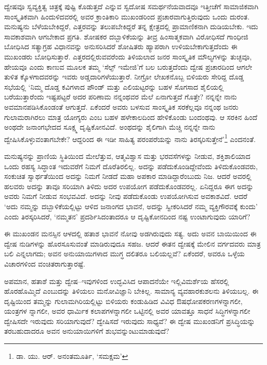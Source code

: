 ದ್ವೇಷವೂ ಸ್ವವ್ಯಕ್ತಿತ್ವ ಚಿತ್ರಕ್ಕೆ ಪುಷ್ಟಿ ಕೊಡುತ್ತದೆ ಎನ್ನುವ ಸ್ವದೋಷ ಸಮರ್ಥನೆಯವಾದವೂ ಇತ್ತೀಚೆಗೆ ಸಾಮಾಜಿಕವಾಗಿ ಸಾಂಸ್ಕೃತಿಕವಾಗಿ ಹಿಂದುಳಿದವರಲ್ಲಿ ಅವರ ಕ್ರಾಂತಿಕಾರಿ ಮುಖಂಡರಿಂದ ಪ್ರಚಾರವಾಗುತ್ತಿರುವುದು ಒಂದು ದುರಂತ. ಮನುಷ್ಯನು ಬೆಳೆಯಬೇಕಿದ್ದರೆ, ಎತ್ತರವನ್ನು ತಲುಪಬೇಕಿದ್ದರೆ ತನ್ನ ಕ್ಷೇತ್ರದಲ್ಲಿ ಪ್ರಾಮಾಣಿಕನಾಗಿ ದುಡಿಯಬೇಕು. ಇದು ಸಾವಕಾಶವಾಗಿ ಆಗಬೇಕಾದ ಪ್ರಗತಿ. ಶೋಷಕರ ದಬ್ಬಾಳಿಕೆಯನ್ನು ತೀವ್ರ ಹಿಂಸಾತ್ಮಕವಾಗಿ ವಿರೋಧಿಸದೆ ಗಾಂಧೀಜಿ ಬೋಧಿಸಿದ ಸತ್ಯಾಗ್ರಹ ವಿಧಾನವನ್ನು ಅನುಸರಿಸಿದರೆ ಶೋಷಿತರು ಹ್ಯಾಪರಾಗಿ ಉಳಿಯಬೇಕಾಗುತ್ತದೆಂದು ಈ ಮುಖಂಡರು ಬೋಧಿಸುತ್ತಾರೆ. ಎತ್ತರದಲ್ಲಿರುವವರೆಂದು ತಿಳಿಯ\-ಲಾದ ಜನರ ಸಾಂಸ್ಕೃತಿಕ ಮೌಲ್ಯಗಳನ್ನು ತುಚ್ಛವೂ, ಹೇಯವೂ ಎಂದು ಕಾಣುವ ಮೂಲಕ ತಮ್ಮ ‘ಸೆಲ್ಫ್ ಇಮೇಜಿ’ಗೆ ಬಲ ಬರುತ್ತದೆಂದು ದ್ವೇಷ ಪ್ರಚಾರದಿಂದ ಆಗಲೇ ತುಳಿತ ಕ್ಕೊಳಗಾದವರನ್ನು ಇವರು ಅಡ್ಡದಾರಿಗಳೆಯುತ್ತಾರೆ. ನೀಗ್ರೋ ಲೇಖಕನೊಬ್ಬ ಬಿಳಿಯರು ಸೇರಿದ್ದ ದೊಡ್ಡ ಸಭೆಯಲ್ಲಿ ‘ನಿಮ್ಮ ದೊಡ್ಡ ಕವಿಗಳಾದ ಪೌಂಡ್ ಮತ್ತು ಎಲಿಯಟ್ಟರನ್ನು ಬಹಳ ಸೊಗಸಾದ ಶೈಲಿಯಲ್ಲಿ ಬರೆಯುತ್ತಾರೆಂದು ಇಷ್ಟಪಟ್ಟರೆ ಅದರ ಪರಿಣಾಮ ನನ್ನಂಥವರ ಮೆಲೆ ಏನಾಗುತ್ತದೆ ಗೊತ್ತೇ? ನನ್ನನ್ನೇ ನಾನು ಅವಮಾನಪಡಿಸಿಕೊಂಡಂತೆ ಆಗುತ್ತದೆ. ಏಕೆಂದರೆ ಅವರು ಬಳಸುವ ಸಾಂಸ್ಕೃತಿಕ ಸರಕೆಲ್ಲವೂ ನನ್ನಂಥ ಜನರು ಗುಲಾಮರಾಗಿರಲು ಮಾತ್ರ ಯೋಗ್ಯರು ಎಂಬ ಬಹಳ ಹಳೇಕಾಲದಿಂದ ಹೇಳಿಕೊಂಡು ಬಂದಂಥವು. ಆ ಸರಕಿನ ಹಿಂದೆ ಅಂಥದೇ ಜನಾಂಗಭೇದದ ಸೂಕ್ಷ್ಮ ದೃಷ್ಟಿಕೋನವಿದೆ. ಅಂಥದನ್ನು ಶೈಲಿಗಾಗಿ ಮೆಚ್ಚಿ ನನ್ನನ್ನೇ ನಾನು ದ್ವೇಷಿಸಿಕೊಳ್ಳುವಂತಾಗಬೇಕೇ? ಆದ್ದರಿಂದ ಈ ಇಡೀ ಸಾಹಿತ್ಯ ಪರಂಪರೆಯನ್ನು ನಾನು ತಿರಸ್ಕರಿಸುತ್ತೇನೆ’\footnote{ ಡಾ. ಯು. ಆರ್. ಅನಂತಮೂರ್ತಿ, ‘ಸಮಕ್ಷಮ’} ಎಂದನಂತೆ.

ಮನುಷ್ಯನನ್ನು ಪ್ರಾಣಿಯ ಸ್ಥಿತಿಯಿಂದ ಮೇಲೆತ್ತುವ, ಆತ್ಮವಿಶ್ವಾಸ ಮತ್ತು ಭರವಸೆಗಳನ್ನು ನೀಡುವ, ಶಕ್ತಿಶಾಲಿಯಾದ ಒಂದು ರಹಸ್ಯ ಸಿದ್ಧಾಂತ ಇದುವರೆಗೆ ನಿಮಗೆ ದೊರೆತಿರಲಿಲ್ಲ. ಅದನ್ನು ಪಡೆದುಕೊಂಡಿದ್ದೇವೆಂದು ತಿಳಿದುಕೊಂಡವರು, ಸಂಕುಚಿತ ಸ್ವಾರ್ಥತೆಯಿಂದ ಅದನ್ನು ನಿಮಗೆ ನೀಡದೆ ಮಹಾ ಅಪಕಾರ ಮಾಡಿದ್ದಾರೆಂಬುದು ನಿಜ. ಆದರೆ ಅವರಲ್ಲಿ ಹಲವರು ಅದನ್ನು ತಾವೂ ಸರಿಯಾಗಿ ತಿಳಿದು ಅದರ ಉಪಯೋಗ ಪಡೆದುಕೊಂಡವರಲ್ಲ. ಏನಿದ್ದರೂ ಈಗ ಅದನ್ನು ಅವರು ನಿಮಗೆ ನೀಡುವ ಸಂಭವವಿದೆ. ಅದನ್ನು ನೀವು ಪಡೆದುಕೊಂಡು ಉಪಯೋಗಿಸುವ ಅವಕಾಶವಿದೆ. ಆದರೆ ‘ಅದು ನಮ್ಮನ್ನು ದಬ್ಬಾಳಿಕೆಯಲ್ಲಿಟ್ಟು ಆಳಿದ ಜನಾಂಗದ ಭಾವನೆ, ಅದನ್ನು ಸ್ವೀಕರಿಸಿದರೆ ನಮ್ಮ ವ್ಯಕ್ತಿಗೌರವಕ್ಕೆ ಕುಂದು’ ಎಂದು ತಿರಸ್ಕರಿಸಿದರೆ, ‘ನಮ್ಮತನ’ ಪ್ರದರ್ಶಿಸಿ\-ದಂತಾದರೂ ಆ ದೃಷ್ಟಿಕೋನದಿಂದ ನಷ್ಟ ಉಂಟಾಗುವುದು ಯಾರಿಗೆ?

\newpage

ಈ ಮುಖಂಡನ ಮನಸ್ಸಿನ ಆಳದಲ್ಲಿ ಹತಾಶ ಭಾವನೆ ನೋವು ಅಡಗಿರುವುದು ಸತ್ಯ. ಅದು ಅವನ ಬಾಯಿಯಿಂದ ಈ ದ್ವೇಷ ನುಡಿಗಳನ್ನು ಹೊರಸೂಸುವಂತೆ ಮಾಡಿರುವುದೂ ಸಹಜ. ಆದರೆ ಈತನ ದ್ವೇಷಕ್ಕೆ ಮೇಲಿನ ವರ್ಗದವರು ಮಾತ್ರ ಬಲಿ ಎನ್ನಲಾಗದು; ಅವನ ಅನುಯಾಯಿಗಳಾದ ಮುಗ್ಧ ದಲಿತರೂ ಬಲಿಯಲ್ಲವೆ? ಏಕೆಂದರೆ, ಅವರೂ ಒಳ್ಳೆಯ ವಿಚಾರಗಳಿಂದ ವಂಚಿತರಾಗುತ್ತಾರಷ್ಟೆ.

ಅಪಮಾನ, ಹತಾಶೆ ಮತ್ತು ದ್ವೇಷ–ಇವುಗಳಿಂದ ಉದ್ಭವಿಸಿದ ಆಪಾದನೆಯೇ ಇಲ್ಲಿ\break ವಿಮರ್ಶೆಯ ಹೆಸರಲ್ಲಿ ಹೊರಹೊಮ್ಮಿದೆ ಎಂಬುದನ್ನು ತಿಳಿಯಲು ಮನೋವಿಜ್ಞಾನಿ ಬೇಕಿಲ್ಲ. ಸಾಮಾನ್ಯ ವ್ಯವಹಾರಕುಶಲನು ತಿಳಿಯಬಲ್ಲ. ಈ ದೃಷ್ಟಿಯಿಂದ ತಮ್ಮನ್ನು ಗುಲಾಮಗಿರಿಯಲ್ಲಿಟ್ಟು ಬಿಳಿಯರು ಕಂಡುಹಿಡಿದ ವಿವಿಧ ಔಷಧೋಪಕರಣಗಳನ್ನಾಗಲೀ, ಯಂತ್ರಗಳ ನ್ನಾಗಲೀ, ಅವರ ಧಾರ್ಮಿಕ ಕಲಾಪಗಳನ್ನಾಗಲೀ ಒಟ್ಟಿನಲ್ಲಿ ಅವರ ಯಾವತ್ತೂ ಸಾಧನೆ ಸಿದ್ಧಿಗಳನ್ನಾಗಲೀ ದ್ವೇಷಿಸದೇ ಇರುವುದು ಸರಿಯಾಗುವುದೆ? ದ್ವೇಷಿಸದೆ ಇರುವುದು ಸಾಧ್ಯವೆ? ಈ ದ್ವೇಷ ಮುಖಂಡನಿಗೆ ಪ್ರಸಿದ್ಧಿಯನ್ನು ತರಬಹುದಾದರೂ ಅವನ ಅನುಯಾಯಿಗಳಿಗೆ ಶುಭವನ್ನುಂಟುಮಾಡುವುದೆ?


